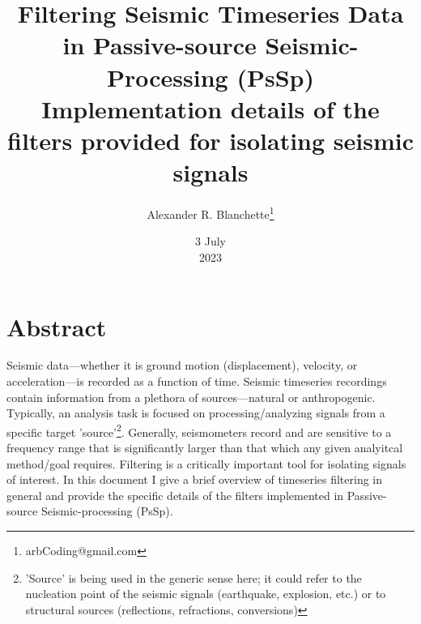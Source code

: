\documentclass[twoside]{article}
\title{\Huge Filtering Seismic Timeseries Data in Passive-source Seismic-Processing (PsSp)\\
\large Implementation details of the filters provided for isolating seismic signals}
\author{Alexander R. Blanchette\thanks{arbCoding@gmail.com}}
\date{3 July\\2023}
\begin{document}
\maketitle
\pagestyle{fancy}
\section{Abstract} \label{Abstract}
Seismic data---whether it is ground motion (displacement), velocity, or acceleration---is recorded as a function of time. Seismic timeseries
recordings contain information from a plethora of sources---natural or anthropogenic. Typically, an analysis task is focused on processing/analyzing
signals from a specific target 'source'\footnote{'Source' is being used in the generic sense here; it could refer to the nucleation point of the seismic
signals (earthquake, explosion, etc.) or to structural sources (reflections, refractions, conversions)}. Generally, seismometers record and are sensitive
to a frequency range that is significantly larger than that which any given analyitcal method/goal requires. Filtering is a critically important tool for
isolating signals of interest. In this document I give a brief overview of timeseries filtering in general and provide the specific details of the filters
implemented in Passive-source Seismic-processing (PsSp).

\end{document}
